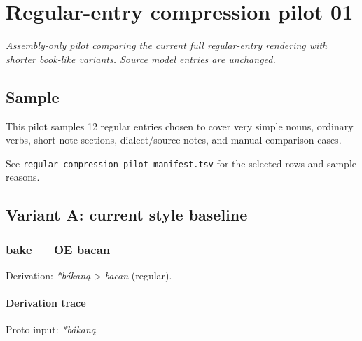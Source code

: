 \documentclass[
  british,
  a4paper,
]{article}
\author{}
\date{}
\begin{document}
\section{Regular-entry compression pilot
01}\label{regular-entry-compression-pilot-01}

\emph{Assembly-only pilot comparing the current full regular-entry
rendering with shorter book-like variants. Source model entries are
unchanged.}

\subsection{Sample}\label{sample}

This pilot samples 12 regular entries chosen to cover very simple nouns,
ordinary verbs, short note sections, dialect/source notes, and manual
comparison cases.

See \texttt{regular\_compression\_pilot\_manifest.tsv} for the selected
rows and sample reasons.

\subsection{Variant A: current style
baseline}\label{variant-a-current-style-baseline}

\subsubsection{bake --- OE bacan}\label{bake-oe-bacan}

Derivation: \emph{*bákaną} \textgreater{} \emph{bacan} (regular).

\paragraph{Derivation trace}\label{derivation-trace}

Proto input: \emph{*bákaną}

\begingroup
\setlength{\fboxsep}{6pt}
\end{document}
